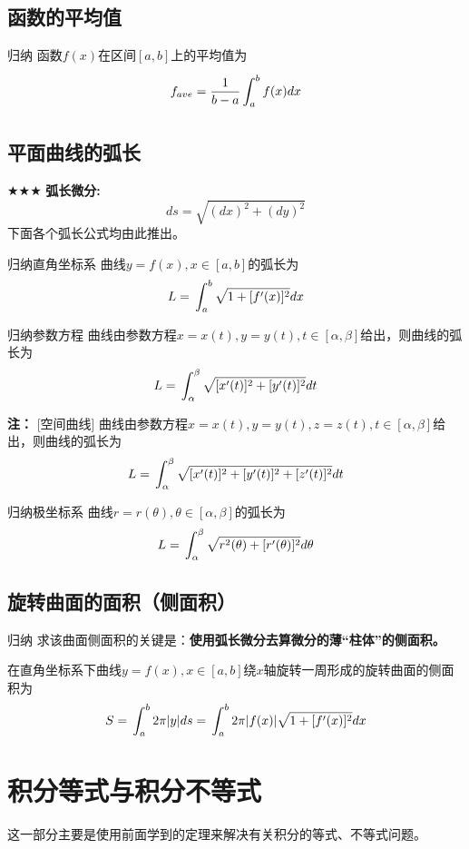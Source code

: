 \documentclass[a4paper,12pt,oneside,fontset=none]{ctexbook}
\let\olddfrac\dfrac
\renewcommand{\dfrac}[2]{
    \olddfrac{#1\vrule width 0pt height 1.15em depth 0em}{#2\vrule width 0pt height 0em depth 0.6em}
}
\let\oldint\int
\renewcommand{\int}{\displaystyle{\vrule width 0pt height 0em depth 0em}\oldint}
\newenvironment{induction}[1][]{\begin{thmBox}{归纳}{#1}}{\end{thmBox}}
\newenvironment{note}{
    \par\vspace{0.5em}\noindent
    \textbf{\color{NoteColor} 注：}
}{
    \par\vspace{0.5em}
}
\numberwithin{equation}{chapter}
\begin{document}
\section{函数的平均值}
\begin{induction}   
    函数$f(x)$在区间$[a, b]$上的平均值为
    $$f_{ave} = \dfrac{1}{b-a}\int_a^b f(x) dx$$
\end{induction}


\section{平面曲线的弧长}
$\bigstar\bigstar\bigstar$ \textbf{弧长微分:}$$ds = \sqrt{(dx)^2 + (dy)^2}$$
下面各个弧长公式均由此推出。
\begin{induction}[直角坐标系]
    曲线$y=f(x), x \in [a, b]$的弧长为
    $$L = \int_a^b \sqrt{1+[f'(x)]^2} dx$$
\end{induction}

\begin{induction}[参数方程]
    曲线由参数方程$x=x(t), y=y(t), t \in [\alpha, \beta]$给出，则曲线的弧长为
    $$L = \int_{\alpha}^{\beta} \sqrt{[x'(t)]^2 + [y'(t)]^2} dt$$
\end{induction}
\begin{note}[空间曲线]
    曲线由参数方程$x=x(t), y=y(t), z=z(t), t \in [\alpha, \beta]$给出，则曲线的弧长为
    $$L = \int_{\alpha}^{\beta} \sqrt{[x'(t)]^2 + [y'(t)]^2 + [z'(t)]^2} dt$$
\end{note}

\begin{induction}[极坐标系]
    曲线$r=r(\theta), \theta \in [\alpha, \beta]$的弧长为
    $$L = \int_{\alpha}^{\beta} \sqrt{r^2(\theta) + [r'(\theta)]^2} d\theta$$
\end{induction}


\section{旋转曲面的面积（侧面积）}
\begin{induction}
    求该曲面侧面积的关键是：\textbf{使用弧长微分去算微分的薄“柱体”的侧面积。}
    
    在直角坐标系下曲线$y=f(x), x \in [a, b]$绕$x$轴旋转一周形成的旋转曲面的侧面积为
    $$S = \int_a^b 2\pi |y| ds = \int_a^b 2\pi |f(x)| \sqrt{1+[f'(x)]^2} dx$$
\end{induction}



\chapter{积分等式与积分不等式}
这一部分主要是使用前面学到的定理来解决有关积分的等式、不等式问题。
\end{document}

